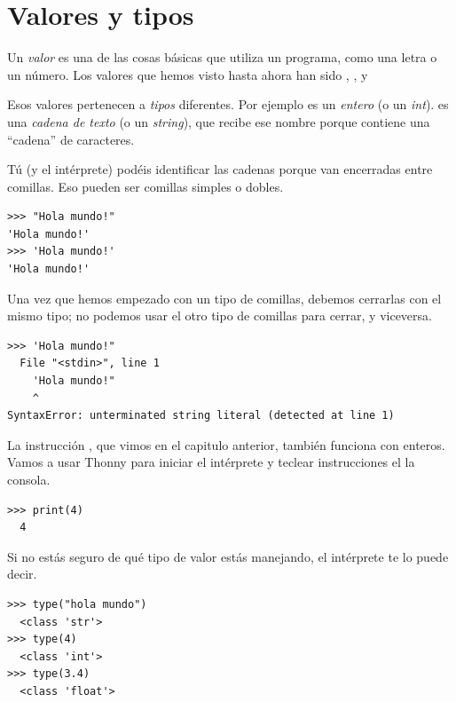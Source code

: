 

\hypertarget{valores-y-tipos}{%
\section{Valores y tipos}\label{valores-y-tipos}}

  

Un \emph{valor} es una de las cosas básicas que utiliza un programa,
como una letra o un número. Los valores que hemos visto hasta ahora han
sido , , y 

Esos valores pertenecen a \emph{tipos} diferentes. Por ejemplo  es un \emph{entero} (o un \emph{int}).  es una \emph{cadena de texto} (o un \emph{string}), que recibe ese nombre porque contiene una ``cadena'' de caracteres.

Tú (y el intérprete) podéis identificar las cadenas porque van encerradas entre comillas. Eso pueden ser comillas simples o dobles.

\begin{Verbatim}[frame=single]
>>> "Hola mundo!"
'Hola mundo!'
>>> 'Hola mundo!'
'Hola mundo!'
\end{Verbatim}

Una vez que hemos empezado con un tipo de comillas, debemos cerrarlas con el mismo tipo; no podemos usar el otro tipo de comillas para cerrar, y viceversa.

\begin{Verbatim}[frame=single]
>>> 'Hola mundo!"
  File "<stdin>", line 1
    'Hola mundo!"
    ^
SyntaxError: unterminated string literal (detected at line 1)
\end{Verbatim}

La instrucción , que vimos en el capitulo anterior, también funciona con enteros. Vamos a usar Thonny para iniciar el intérprete y teclear instrucciones el la consola.

\begin{Verbatim}[frame=single]
>>> print(4)
  4
\end{Verbatim}

Si no estás seguro de qué tipo de valor estás manejando, el intérprete te lo puede decir.

\begin{Verbatim}[frame=single]
>>> type("hola mundo")
  <class 'str'>
>>> type(4)
  <class 'int'>
>>> type(3.4)
  <class 'float'>
\end{Verbatim}


